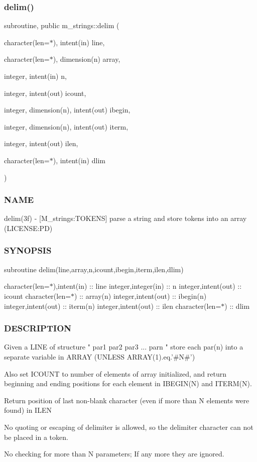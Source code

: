 \subsubsection{\texorpdfstring{delim()}{delim()}}
{\footnotesize\ttfamily subroutine, public m\+\_\+strings\+::delim (\begin{DoxyParamCaption}\item[{character(len=$\ast$), intent(in)}]{line,  }\item[{character(len=$\ast$), dimension(n)}]{array,  }\item[{integer, intent(in)}]{n,  }\item[{integer, intent(out)}]{icount,  }\item[{integer, dimension(n), intent(out)}]{ibegin,  }\item[{integer, dimension(n), intent(out)}]{iterm,  }\item[{integer, intent(out)}]{ilen,  }\item[{character(len=$\ast$), intent(in)}]{dlim }\end{DoxyParamCaption})}



\subsubsection*{N\+A\+ME}

delim(3f) -\/ \mbox{[}M\+\_\+strings\+:T\+O\+K\+E\+NS\mbox{]} parse a string and store tokens into an array (L\+I\+C\+E\+N\+SE\+:PD) \subsubsection*{S\+Y\+N\+O\+P\+S\+IS}

subroutine delim(line,array,n,icount,ibegin,iterm,ilen,dlim)

character(len=$\ast$),intent(in) \+:\+: line integer,integer(in) \+:\+: n integer,intent(out) \+:\+: icount character(len=$\ast$) \+:\+: array(n) integer,intent(out) \+:\+: ibegin(n) integer,intent(out) \+:\+: iterm(n) integer,intent(out) \+:\+: ilen character(len=$\ast$) \+:\+: dlim \subsubsection*{D\+E\+S\+C\+R\+I\+P\+T\+I\+ON}

\begin{DoxyVerb}  Given a LINE of structure " par1 par2 par3 ... parn "
  store each par(n) into a separate variable in ARRAY (UNLESS
  ARRAY(1).eq.'#N#')

  Also set ICOUNT to number of elements of array initialized, and
  return beginning and ending positions for each element in IBEGIN(N)
  and ITERM(N).

  Return position of last non-blank character (even if more
  than N elements were found) in ILEN

  No quoting or escaping of delimiter is allowed, so the delimiter
  character can not be placed in a token.

  No checking for more than N parameters; If any more they are ignored.
\end{DoxyVerb}


